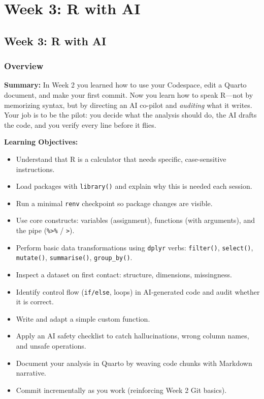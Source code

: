 \documentclass[
  letterpaper,
  DIV=11,
  numbers=noendperiod,
  oneside]{scrreprt}
\providecommand{\tightlist}{%
  \setlength{\itemsep}{0pt}\setlength{\parskip}{0pt}}
\begin{document}
\part{Week 3: R with AI}

\chapter*{Week 3: R with AI}\label{week-3-r-with-ai-1}


\section*{Overview}\label{overview-2}


\textbf{Summary:} In Week 2 you learned how to use your Codespace, edit
a Quarto document, and make your first commit. Now you learn how to
speak R---not by memorizing syntax, but by directing an AI co-pilot and
\emph{auditing} what it writes. Your job is to be the pilot: you decide
what the analysis should do, the AI drafts the code, and you verify
every line before it flies.

\textbf{Learning Objectives:}

\begin{itemize}
\tightlist
\item
  Understand that R is a calculator that needs specific, case-sensitive
  instructions.
\item
  Load packages with \texttt{library()} and explain why this is needed
  each session.
\item
  Run a minimal \texttt{renv} checkpoint so package changes are visible.
\item
  Use core constructs: variables (assignment), functions (with
  arguments), and the pipe (\texttt{\%\textgreater{}\%} /
  \texttt{\textbar{}\textgreater{}}).
\item
  Perform basic data transformations using \texttt{dplyr} verbs:
  \texttt{filter()}, \texttt{select()}, \texttt{mutate()},
  \texttt{summarise()}, \texttt{group\_by()}.
\item
  Inspect a dataset on first contact: structure, dimensions,
  missingness.
\item
  Identify control flow (\texttt{if/else}, loops) in AI-generated code
  and audit whether it is correct.
\item
  Write and adapt a simple custom function.
\item
  Apply an AI safety checklist to catch hallucinations, wrong column
  names, and unsafe operations.
\item
  Document your analysis in Quarto by weaving code chunks with Markdown
  narrative.
\item
  Commit incrementally as you work (reinforcing Week 2 Git basics).
\end{itemize}
\end{document}
